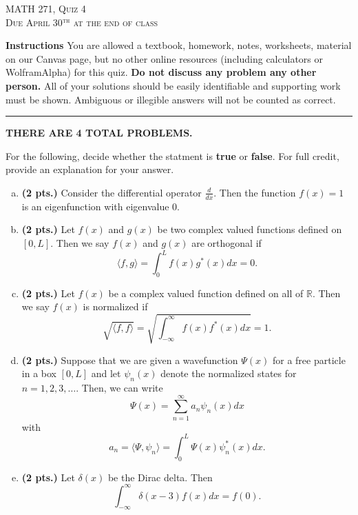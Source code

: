 \documentclass[12pt]{amsbook}
\newcommand{\R}{\mathbb{R}}
\newcommand{\innprod}[2]{\langle #1, #2 \rangle}
\begin{document}

\begin{center}
   \textsc{\large MATH 271, Quiz 4}\\
   \textsc{Due April 30$^\textrm{th}$ at the end of class}
\end{center}

\vspace{1cm}

\noindent\textbf{Instructions} \; You are allowed a textbook, homework, notes, worksheets, material on our Canvas page, but no other online resources (including calculators or WolframAlpha) for this quiz.  \textbf{Do not discuss any problem any other person.} All of your solutions should be easily identifiable and supporting work must be shown.  Ambiguous or illegible answers will not be counted as correct.


\vspace*{.5cm}
\hrule
\vspace*{.5cm}

\begin{center}\textbf{\large THERE ARE 4 TOTAL PROBLEMS.}\normalsize \end{center}

\begin{problem} For the following, decide whether the statment is \textbf{true} or \textbf{false}. For full credit, provide an explanation for your answer.
\begin{enumerate}[(a)]
    \item \textbf{(2 pts.)} Consider the differential operator $\frac{d}{dx}$. Then the function $f(x)=1$ is an eigenfunction with eigenvalue 0.
    \item \textbf{(2 pts.)} Let $f(x)$ and $g(x)$ be two complex valued functions defined on $[0,L]$. Then we say $f(x)$ and $g(x)$ are orthogonal if
    \[
    \innprod{f}{g} = \int_0^L f(x)g^*(x)dx = 0.
    \]
    \item \textbf{(2 pts.)} Let $f(x)$ be a complex valued function defined on all of $\R$. Then we say $f(x)$ is normalized if
    \[
    \sqrt{\innprod{f}{f}} = \sqrt{\int_{-\infty}^\infty f(x)f^*(x)dx} = 1.
    \]
    \item \textbf{(2 pts.)} Suppose that we are given a wavefunction $\Psi(x)$ for a free particle in a box $[0,L]$ and let $\psi_n(x)$ denote the normalized states for $n=1,2,3,\dots$. Then, we can write
    \[
    \Psi(x) = \sum_{n=1}^\infty a_n \psi_n(x)dx
    \]
    with 
    \[
    a_n = \innprod{\Psi}{\psi_n} = \int_0^L \Psi(x) \psi_n^*(x)dx.
    \]
    \item \textbf{(2 pts.)} Let $\delta(x)$ be the Dirac delta. Then
    \[
    \int_{-\infty}^\infty \delta(x-3) f(x)dx = f(0).
    \]
\end{enumerate}
\end{problem}
\end{document}
